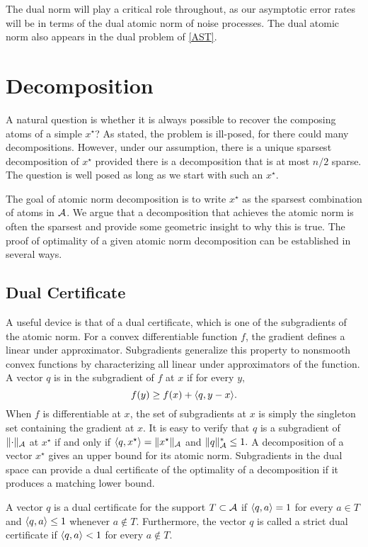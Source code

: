 The dual norm will play a critical role throughout, as our asymptotic error
rates will be in terms of the dual atomic norm of noise processes. The dual
atomic norm also appears in the dual problem of \eqref{AST}.

\section{Decomposition}
\label{sec:decomposition}

A natural question is whether it is always possible to recover the composing
atoms of a simple $x^\star$? As stated, the problem is ill-posed, for there
could many decompositions. However, under our assumption, there is a unique
sparsest decomposition of $x^\star$ provided there is a decomposition that is at
most $n/2$ sparse. The question is well posed as long as we start with such an $x^\star.$

The goal of atomic norm decomposition is to write $x^\star$ as the sparsest
combination of atoms in $\mathcal{A}$. We argue that a decomposition that achieves the
atomic norm is often the sparsest and provide some geometric insight to why this
is true. The proof of optimality of a given atomic norm decomposition can be
established in several ways.

\subsection{Dual Certificate}

A useful device is that of a dual certificate, which is one of the subgradients
of the atomic norm. For a convex differentiable function $f$, the gradient
defines a linear under approximator. Subgradients generalize this property to
nonsmooth convex functions by characterizing all linear under approximators of
the function. A vector $q$ is in the subgradient of $f$ at $x$ if for
every $y,$
\[
	f(y) \geq f(x) + \langle q, y-x\rangle.
\]
When $f$ is differentiable at $x$, the set of subgradients at $x$ is simply the
singleton set containing the gradient at $x$. It is easy to verify that $q$ is a
subgradient of $\lVert\cdot\rVert_{\mathcal{A}} $ at $x^\star$ if and only if $\langle q,
x^\star \rangle = \lVert x^\star\rVert_{\mathcal{A}}$ and $\lVert q\rVert_{\mathcal{A}}^* \leq 1.$ A
decomposition of a vector $x^\star$ gives an upper bound for its atomic norm.
Subgradients in the dual space can provide a dual certificate of the optimality
of a decomposition if it produces a matching lower bound.

\begin{definition}\label{def:dual-certificate}
A vector $q$ is a dual certificate for the support $T \subset \mathcal{A}$ if 
$\langle q, a\rangle = 1$ for every $a \in T$ and $\langle q, a\rangle \leq 1$ whenever $a \not\in T$. Furthermore, the vector $q$ is called a strict dual certificate if $\langle q, a\rangle < 1$ for every $a \not\in T.$
\end{definition}

